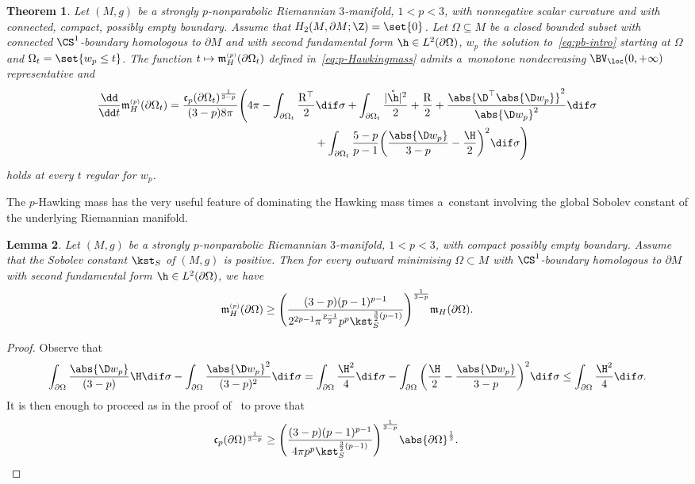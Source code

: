 \documentclass[10pt,a4paper]{amsart}
\numberwithin{equation}{section}
\newtheorem{Theorem}{Theorem}[section]
\newtheorem{Lemma}[Theorem]{Lemma}
\renewcommand{\ncapa}{\mathfrak{c}}
\newcommand{\ma}{\mathfrak{m}}
\newcommand{\tp}[1][p]{{\text{\tiny$(#1)$}}}
\begin{document}
\begin{Theorem}\label{thm:AMMO_monotonicity}
 Let $(M,g)$ be a strongly $p$-nonparabolic Riemannian $3$-manifold, ${1<p<3}$, with nonnegative scalar curvature and with connected, compact, possibly empty boundary. Assume that $H_2(M, \partial M;\Z) = \set{0}$. Let $\Omega\subseteq M$ be a closed bounded subset with connected $\CS^1$-boundary homologous to $\partial M$ and with second fundamental form $\h \in L^2(\partial \Omega)$, $w_p$ the solution to~\eqref{eq:pb-intro} starting at $\Omega$ and $\Omega_t= \set{w_p \leq t}$. The function $t\mapsto \ma_H^{\tp}(\partial \Omega_t)$ defined in~\eqref{eq:p-Hawkingmass} admits a~monotone nondecreasing $\BV_{\loc}(0,+\infty)$ representative and
 \begin{gather}
 \frac{\dd}{\dd t} \ma^{\tp}_H (\partial \Omega_t)=\frac{\ncapa_p(\partial \Omega_t)^{\frac{1}{3-p}}}{(3-p) 8 \pi} \Bigg( 4\pi -\int_{\partial \Omega_t}\frac{\mathrm{R}^\top}{2} \dif \sigma +\int_{\partial \Omega_t} \frac{\vert \mathring{\h} \vert^2}{2} + \frac{ \mathrm{R}}{2} + \frac{ \abs{ \D^\top \abs{ \D w_p} }^2}{\abs{ \D w_p}^2}\dif \sigma \nonumber \\
 \hphantom{\frac{\dd}{\dd t} \ma^{\tp}_H (\partial \Omega_t)=\frac{\ncapa_p(\partial \Omega_t)^{\frac{1}{3-p}}}{(3-p) 8 \pi} \bigg(}{}
 + \int_{\partial \Omega_t}\frac{5-p}{p-1}\bigg(\frac{ \abs{\D w_p}}{3-p} - \frac{ \H}{2}\bigg)^2\dif \sigma\Bigg)\label{eq:AMMO_monotonicity}
 \end{gather}
 holds at every $t$ regular for $w_p$.
\end{Theorem}
The $p$-Hawking mass has the very useful feature of dominating the Hawking mass times a~constant involving the global Sobolev constant of the underlying Riemannian manifold.
\begin{Lemma}\label{thm:hawking_p-hawking}
 Let $(M,g)$ be a strongly $p$-nonparabolic Riemannian $3$-manifold, $1<p<3$, with compact possibly empty boundary. Assume that the Sobolev constant $\kst_S$ of $(M, g)$ is positive. Then for every outward minimising $\Omega\subset M$ with $\CS^{1}$-boundary homologous to $\partial M$ with second fundamental form $\h \in L^2(\partial \Omega)$, we have
 \[
 \ma^{\tp}_{H}(\partial \Omega) \geq \Bigg( \frac{(3-p) (p-1)^{p-1}}{2^{2p-1}\pi^{\frac{p-1}{2}} p^{p}\kst_{S}^{\frac{3}{2}(p-1)}} \Bigg)^{\frac{1}{3-p}} \ma_{H}(\partial \Omega).
 \]
 \end{Lemma}

\begin{proof} Observe that
\[
 \int_{\partial \Omega}\frac{\abs{ \D w_p} }{(3-p)}\H \dif \sigma - \int_{\partial \Omega}\frac{\abs{\D w_p}^2}{(3-p)^2}\dif \sigma =\int_{\partial \Omega} \frac{\H^2}{4} \dif \sigma - \int_{\partial \Omega} \bigg( \frac{\H}{2} - \frac{ \abs{ \D w_p}}{3-p}\bigg)^2 \dif \sigma\leq \int_{\partial \Omega} \frac{ \H^2}{4} \dif \sigma.
\]
It is then enough to proceed as in the proof of~\cite[Theorem 1.3]{fogagnolo_minimisinghullscapacityisoperimetric_2022} to prove that
\[
 \ncapa_p (\partial \Omega)^{\frac{1}{3-p}} \geq \Bigg( \frac{(3-p) (p-1)^{p-1}}{4 \pi p^{p}\kst_{ S}^{\frac{3}{2}(p-1)}} \Bigg)^{\frac{1}{3-p}}\abs{ \partial \Omega}^{\frac{1}{2}}.
\tag*{\qed}
\]
\renewcommand{\qed}{}
\end{proof}
\end{document}
